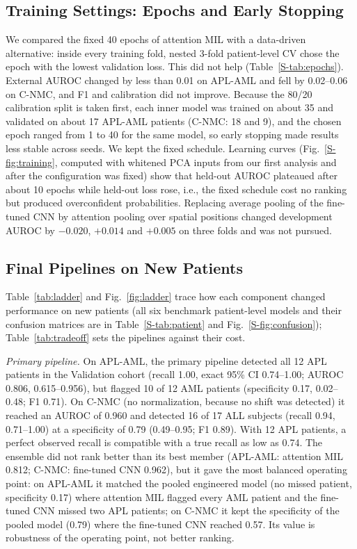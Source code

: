 \documentclass[journal]{IEEEtran}
\begin{document}
\subsection{Training Settings: Epochs and Early Stopping}
\label{sec:training}
We compared the fixed 40 epochs of attention MIL with a data-driven alternative: inside every training fold, nested 3-fold patient-level CV chose the epoch with the lowest validation loss. This did not help (Table~\ref{S-tab:epochs}). External AUROC changed by less than 0.01 on APL-AML and fell by 0.02--0.06 on C-NMC, and F1 and calibration did not improve. Because the 80/20 calibration split is taken first, each inner model was trained on about 35 and validated on about 17 APL-AML patients (C-NMC: 18 and 9), and the chosen epoch ranged from 1 to 40 for the same model, so early stopping made results less stable across seeds. We kept the fixed schedule. Learning curves (Fig.~\ref{S-fig:training}, computed with whitened PCA inputs from our first analysis and after the configuration was fixed) show that held-out AUROC plateaued after about 10 epochs while held-out loss rose, i.e., the fixed schedule cost no ranking but produced overconfident probabilities. Replacing average pooling of the fine-tuned CNN by attention pooling over spatial positions changed development AUROC by $-0.020$, $+0.014$ and $+0.005$ on three folds and was not pursued.

\subsection{Final Pipelines on New Patients}
\label{sec:finalres}
Table~\ref{tab:ladder} and Fig.~\ref{fig:ladder} trace how each component changed performance on new patients (all six benchmark patient-level models and their confusion matrices are in Table~\ref{S-tab:patient} and Fig.~\ref{S-fig:confusion}); Table~\ref{tab:tradeoff} sets the pipelines against their cost.

\emph{Primary pipeline.} On APL-AML, the primary pipeline detected all 12 APL patients in the Validation cohort (recall 1.00, exact 95\% CI 0.74--1.00; AUROC 0.806, 0.615--0.956), but flagged 10 of 12 AML patients (specificity 0.17, 0.02--0.48; F1 0.71). On C-NMC (no normalization, because no shift was detected) it reached an AUROC of 0.960 and detected 16 of 17 ALL subjects (recall 0.94, 0.71--1.00) at a specificity of 0.79 (0.49--0.95; F1 0.89). With 12 APL patients, a perfect observed recall is compatible with a true recall as low as 0.74. The ensemble did not rank better than its best member (APL-AML: attention MIL 0.812; C-NMC: fine-tuned CNN 0.962), but it gave the most balanced operating point: on APL-AML it matched the pooled engineered model (no missed patient, specificity 0.17) where attention MIL flagged every AML patient and the fine-tuned CNN missed two APL patients; on C-NMC it kept the specificity of the pooled model (0.79) where the fine-tuned CNN reached 0.57. Its value is robustness of the operating point, not better ranking.
\end{document}
